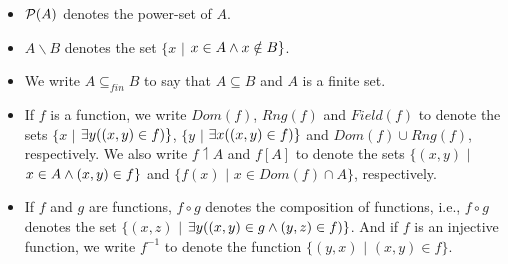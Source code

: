 \begin{itemize}
\item $\mathcal{P}(A)$ denotes the power-set of $A$.
\item $A \backslash B$ denotes the set $\{x$ $|$ $ x \in A \wedge x \notin B\}$.
\item We write $A \subseteq_{fin} B$ to say that $A \subseteq B$ and $A$ is a finite set.
\item If $f$ is a function, we write $Dom(f)$, $Rng(f)$ and $Field(f)$ to denote the sets $\{x$ $|$ $ \exists y ((x,y) \in f)\}$, $\{y$ $|$ $ \exists x ((x,y) \in f)\}$  and $Dom(f)\cup Rng(f)$, respectively. We also write $f \upharpoonleft A$ and $f[A]$ to denote the sets $\{(x,y)$ $|$ $ x \in A \wedge (x,y) \in f\}$
and $\{f(x)$ $|$ $ x \in Dom(f) \cap A\}$, respectively.
\item If $f$ and $g$ are functions, $f\circ g$ denotes the composition of functions, i.e., $f\circ g$ denotes the set $\{(x,z)$ $|$ $ \exists y ((x,y) \in g \wedge (y,z) \in f)\}$. And if $f$ is an injective function, we write $f^{-1}$ to denote the function $\{(y,x)$ $|$ $ (x,y) \in f \}$.

\end{itemize}
